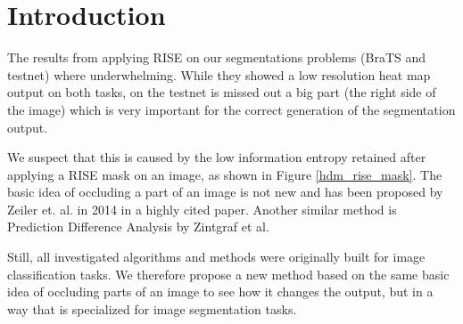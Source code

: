 \section{Introduction}

The results from applying RISE on our segmentations problems (BraTS and testnet) where underwhelming. While they showed a low resolution heat map output on both tasks,
on the testnet is missed out a big part (the right side of the image) which is very important for the correct generation of the segmentation output.

We suspect that this is caused by the low information entropy retained after applying a RISE mask on an image, as shown in Figure \ref{hdm_rise_mask}.
The basic idea of occluding a part of an image is not new and has been proposed by Zeiler et. al. in 2014 \cite{zeiler2014visualizing} in a highly cited paper.
Another similar method is Prediction Difference Analysis \cite{zintgraf2017visualizing} by Zintgraf et al.

Still, all investigated algorithms and methods were originally built for image classification tasks. We therefore propose a new method based on the same basic idea
of occluding parts of an image to see how it changes the output, but in a way that is specialized for image segmentation tasks.

